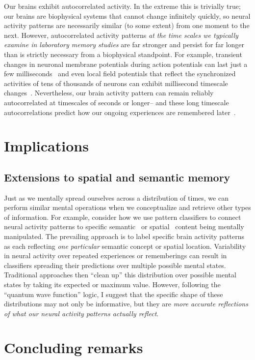 \documentclass{article}
\begin{document}
Our brains exhibit autocorrelated activity.  In the extreme this is trivially true; our brains are biophysical systems that cannot change infinitely quickly, so neural activity patterns are necessarily similar (to some extent) from one moment to the next.  However, autocorrelated activity patterns \textit{at the time scales we typically examine in laboratory memory studies} are far stronger and persist for far longer than is strictly necessary from a biophysical standpoint.  For example, transient changes in neuronal membrane potentials during action potentials can last just a few milliseconds~\citep{HodgHuxl52} and even local field potentials that reflect the synchronized activities of tens of thousands of neurons can exhibit millisecond timescale changes~\citep{Frie05, Buzs06}.  Nevertheless, our brain activity pattern can remain reliably autocorrelated at timescales of seconds or longer-- and these long timescale autocorrelations predict how our ongoing experiences are remembered later~\citep[e.g.][]{MannEtal07, MannEtal11, HowaEtal12, FolkEtal18}.

\section*{Implications}
\subsection*{Extensions to spatial and semantic memory}
Just as we mentally spread ourselves across a distribution of times, we can perform similar mental operations when we conceptualize and retrieve other types of information.  For example, consider how we use pattern classifiers to connect neural activity patterns to specific semantic~\citep{PolyEtal05, MitcEtal08, MannEtal12} or spatial~\citep{MillEtal13} content being mentally manipulated.  The prevailing approach is to label specific brain activity patterns as each reflecting \textit{one particular} semantic concept or spatial location.  Variability in neural activity over repeated experiences or rememberings can result in classifiers spreading their predictions over multiple possible mental states.  Traditional approaches then ``clean up'' this distribution over possible mental states by taking its expected or maximum value.  However, following the ``quantum wave function'' logic, I suggest that the specific shape of these distributions may not only be informative, but they are \textit{more accurate reflections of what our neural activity patterns actually reflect}.

\section*{Concluding remarks}



\end{document}
